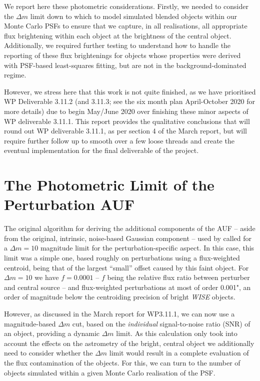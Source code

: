 \documentclass[fleqn,usenatbib]{mnras}
\begin{document}
We report here these photometric considerations.
Firstly, we needed to consider the $\Delta m$ limit down to which to model simulated blended objects within our Monte Carlo PSFs to ensure that we capture, in all realisations, all appropriate flux brightening within each object at the brightness of the central object.
Additionally, we required further testing to understand how to handle the reporting of these flux brightenings for objects whose properties were derived with PSF-based least-squares fitting, but are not in the background-dominated regime.

However, we stress here that this work is not quite finished, as we have prioritised WP Deliverable 3.11.2 (and 3.11.3; see the six month plan April-October 2020 for more details) due to begin May/June 2020 over finishing these minor aspects of WP deliverable 3.11.1.
This report provides the qualitative conclusions that will round out WP deliverable 3.11.1, as per section 4 of the March report, but will require further follow up to smooth over a few loose threads and create the eventual implementation for the final deliverable of the project.

\section{The Photometric Limit of the Perturbation AUF}
\label{sec:photolimits}
The original algorithm for deriving the additional components of the AUF -- aside from the original, intrinsic, noise-based Gaussian component -- used by \citet{2018MNRAS.481.2148W} called for a $\Delta m = 10$ magnitude limit for the perturbation-specific aspect.
In this case, this limit was a simple one, based roughly on perturbations using a flux-weighted centroid, being that of the largest ``small'' offset caused by this faint object.
For $\Delta m = 10$ we have $f = 0.0001$ -- $f$ being the relative flux ratio between perturber and central source -- and flux-weighted perturbations at most of order 0.001", an order of magnitude below the centroiding precision of bright \textit{WISE} objects.

However, as discussed in the March report for WP3.11.1, we can now use a magnitude-based $\Delta m$ cut, based on the \textit{individual} signal-to-noise ratio (SNR) of an object, providing a dynamic $\Delta m$ limit.
As this calculation only took into account the effects on the astrometry of the bright, central object we additionally need to consider whether the $\Delta m$ limit would result in a complete evaluation of the flux contamination of the objects.
For this, we can turn to the number of objects simulated within a given Monte Carlo realisation of the PSF.
\end{document}
